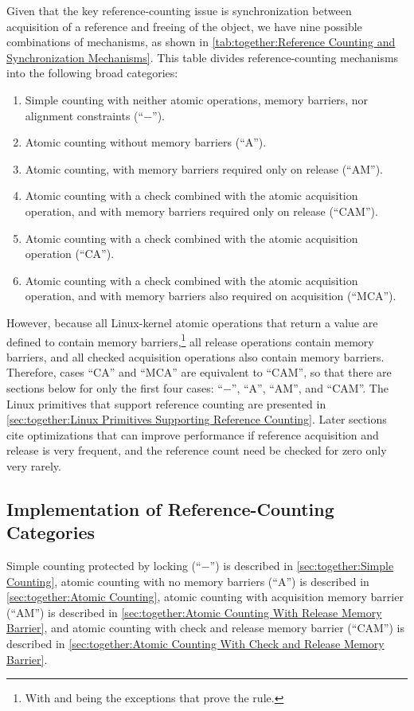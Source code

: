 Given that the key reference-counting issue
is synchronization between acquisition
of a reference and freeing of the object, we have nine possible
combinations of mechanisms, as shown in
\cref{tab:together:Reference Counting and Synchronization Mechanisms}.
This table
divides reference-counting mechanisms into the following broad categories:
\begin{enumerate}
\item	Simple counting with neither atomic operations, memory
	barriers, nor alignment constraints (``$-$'').
\item	Atomic counting without memory barriers (``A'').
\item	Atomic counting, with memory barriers required only on release
	(``AM'').
\item	Atomic counting with a check combined with the atomic acquisition
	operation, and with memory barriers required only on release
	(``CAM'').
\item	Atomic counting with a check combined with the atomic acquisition
	operation (``CA'').
\item	Atomic counting with a check combined with the atomic acquisition
	operation, and with memory barriers also required on acquisition
	(``MCA'').
\end{enumerate}
However, because all Linux-kernel atomic operations that return a
value are defined to contain memory barriers,\footnote{
	With  and  being the
	exceptions that prove the rule.}
all release operations
contain memory barriers, and all checked acquisition operations also
contain memory barriers.
Therefore, cases ``CA'' and ``MCA'' are equivalent to ``CAM'', so that
there are sections below for only the first four cases:
``$-$'', ``A'', ``AM'', and ``CAM''.
The Linux primitives that support reference counting are presented in
\cref{sec:together:Linux Primitives Supporting Reference Counting}.
Later sections cite optimizations that can improve performance
if reference acquisition and release is very frequent, and the
reference count need be checked for zero only very rarely.

\subsection{Implementation of Reference-Counting Categories}
\label{sec:together:Implementation of Reference-Counting Categories}

Simple counting protected by locking (``$-$'') is described in
\cref{sec:together:Simple Counting},
atomic counting with no memory barriers (``A'') is described in
\cref{sec:together:Atomic Counting},
atomic counting with acquisition memory barrier (``AM'') is described in
\cref{sec:together:Atomic Counting With Release Memory Barrier},
and
atomic counting with check and release memory barrier (``CAM'') is described in
\cref{sec:together:Atomic Counting With Check and Release Memory Barrier}.

